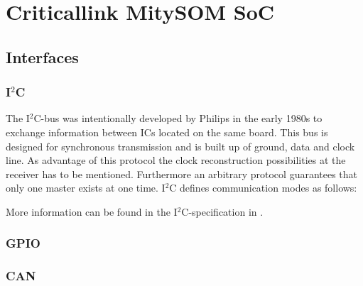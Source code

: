 \chapter{Criticallink MitySOM SoC}

\section{Interfaces}
\subsection{I$^2$C}
The I$^2$C-bus was intentionally developed by Philips in the early 1980s to exchange information between ICs located on the same board. This bus is designed for synchronous transmission and is built up of ground, data and clock line. As advantage of this protocol the clock reconstruction possibilities at the receiver has to be mentioned. Furthermore an arbitrary protocol guarantees that only one master exists at one time. I$^2$C defines communication modes as follows:

More information can be found in the I$^2$C-specification in \cite{I2Cspec}.
\subsection{GPIO}
\subsection{CAN}